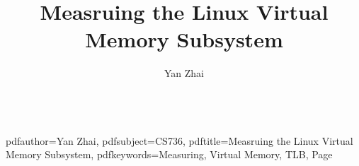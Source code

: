 \documentclass{sig-alternate}
\begin{document}
\hypersetup
{
    pdfauthor={Yan Zhai},
    pdfsubject={CS736},
    pdftitle={Measruing the Linux Virtual Memory Subsystem},
    pdfkeywords={Measuring, Virtual Memory, TLB, Page}
}

\title{Measruing the Linux Virtual Memory Subsystem}

\author{
    \alignauthor Yan Zhai\\
        \\
}

\maketitle






%
%
%



\end{document}
